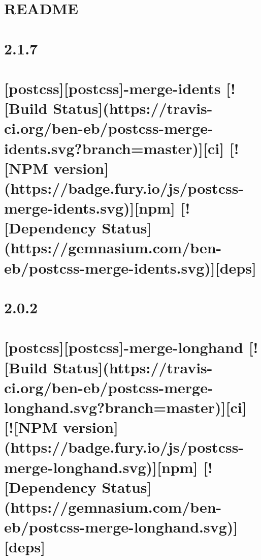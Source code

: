 \documentclass[twoside]{book}
\newcommand{\+}{\discretionary{\mbox{\scriptsize$\hookleftarrow$}}{}{}}
\begin{document}
\chapter{R\+E\+A\+D\+ME}
\label{md__c_1_workspace_demo_src_main_script_node_modules_postcss-loader__r_e_a_d_m_e}

\chapter{2.1.7}
\label{md__c_1_workspace_demo_src_main_script_node_modules_postcss-merge-idents__c_h_a_n_g_e_l_o_g}

\chapter{\mbox{[}postcss\mbox{]}\mbox{[}postcss\mbox{]}-\/merge-\/idents \mbox{[}!\mbox{[}Build Status\mbox{]}(https\+://travis-\/ci.org/ben-\/eb/postcss-\/merge-\/idents.svg?branch=master)\mbox{]}\mbox{[}ci\mbox{]} \mbox{[}!\mbox{[}N\+PM version\mbox{]}(https\+://badge.fury.\+io/js/postcss-\/merge-\/idents.svg)\mbox{]}\mbox{[}npm\mbox{]} \mbox{[}!\mbox{[}Dependency Status\mbox{]}(https\+://gemnasium.com/ben-\/eb/postcss-\/merge-\/idents.svg)\mbox{]}\mbox{[}deps\mbox{]}}
\label{md__c_1_workspace_demo_src_main_script_node_modules_postcss-merge-idents__r_e_a_d_m_e}

\chapter{2.0.2}
\label{md__c_1_workspace_demo_src_main_script_node_modules_postcss-merge-longhand__c_h_a_n_g_e_l_o_g}

\chapter{\mbox{[}postcss\mbox{]}\mbox{[}postcss\mbox{]}-\/merge-\/longhand \mbox{[}!\mbox{[}Build Status\mbox{]}(https\+://travis-\/ci.org/ben-\/eb/postcss-\/merge-\/longhand.svg?branch=master)\mbox{]}\mbox{[}ci\mbox{]} \mbox{[}!\mbox{[}N\+PM version\mbox{]}(https\+://badge.fury.\+io/js/postcss-\/merge-\/longhand.svg)\mbox{]}\mbox{[}npm\mbox{]} \mbox{[}!\mbox{[}Dependency Status\mbox{]}(https\+://gemnasium.com/ben-\/eb/postcss-\/merge-\/longhand.svg)\mbox{]}\mbox{[}deps\mbox{]}}
\label{md__c_1_workspace_demo_src_main_script_node_modules_postcss-merge-longhand__r_e_a_d_m_e}

\end{document}
